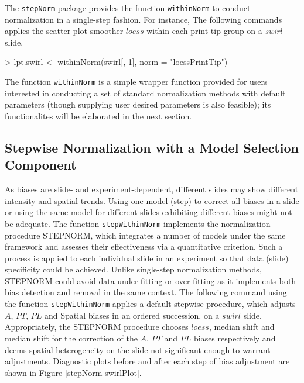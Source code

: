 \documentclass[11pt]{article}
\newcommand{\code}[1]{{\tt #1}}
\newcommand{\Rfunc}[1]{{\tt #1}}
\begin{document}
The \code{stepNorm} package provides the function 
\Rfunc{withinNorm} to conduct normalization in a single-step 
fashion. For instance, The following commands applies the 
scatter plot smoother $loess$ within each print-tip-group
on a \emph{swirl} slide.

\begin{Schunk}
\begin{Sinput}
> lpt.swirl <- withinNorm(swirl[, 1], norm = "loessPrintTip")
\end{Sinput}
\end{Schunk}

The function \Rfunc{withinNorm} is a simple wrapper function provided
for users interested in conducting a set of standard normalization
methods with default parameters (though supplying user desired parameters
is also feasible); its functionalites will be elaborated in the next
section.\\

\subsection{Stepwise Normalization with a Model Selection Component}  

As biases are slide- and experiment-dependent, 
different slides may show different intensity and spatial trends. Using one 
model (step) to correct all biases in a slide or using the same model for 
different slides exhibiting different biases might not be adequate. The
function \Rfunc{stepWithinNorm} implements the normalization procedure STEPNORM, 
which integrates a number of models under the same framework and assesses 
their effectiveness via a quantitative criterion. Such a process is applied 
to each individual slide in an experiment so that data (slide) specificity 
could be achieved. Unlike single-step normalization methods, STEPNORM could 
avoid data under-fitting or over-fitting as it implements both bias detection 
and removal in the same context. The following command using the function
\Rfunc{stepWithinNorm} applies a default stepwise procedure, which adjusts
$A$, $PT$, $PL$ and Spatial biases in an ordered succession, on a $swirl$
slide. Appropriately, the STEPNORM procedure chooses $loess$, median shift and median
shift for the correction of the $A$, $PT$ and $PL$ biases respectively and deems 
spatial heterogeneity on the slide not significant enough to warrant adjustments. 
Diagnostic plots before and after each step of bias adjustment are shown
in Figure \ref{stepNorm-swirlPlot}.
\end{document}
